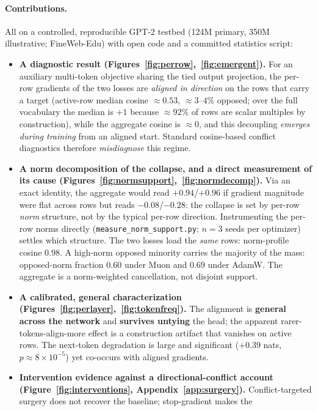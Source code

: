 \paragraph{Contributions.} All on a controlled, reproducible GPT-2 testbed (124M
primary, 350M illustrative; FineWeb-Edu) with open code and a committed statistics
script:
\begin{itemize}
\item \textbf{A diagnostic result (Figures~\ref{fig:perrow},~\ref{fig:emergent}).}
  For an auxiliary multi-token objective sharing the tied output projection, the
  per-row gradients of the two losses are \emph{aligned in direction} on the rows
  that carry a target (active-row median cosine ${\approx}0.53$, ${\approx}3$--$4\%$
  opposed; over the full vocabulary the median is $+1$ because ${\approx}92\%$
  of rows are scalar multiples by construction), while the aggregate cosine is
  $\approx 0$, and this decoupling \emph{emerges during training} from an aligned
  start. Standard cosine-based conflict diagnostics therefore \emph{misdiagnose}
  this regime.
\item \textbf{A norm decomposition of the collapse, and a direct measurement of
  its cause (Figures~\ref{fig:normsupport},~\ref{fig:normdecomp}).} Via an exact
  identity, the aggregate would read $+0.94$/$+0.96$ if gradient magnitude were
  flat across rows but reads $-0.08$/$-0.28$: the collapse is set by per-row
  \emph{norm} structure, not by the typical per-row direction. Instrumenting the per-row norms directly (\texttt{measure\_norm\_support.py}; $n{=}3$ seeds per optimizer) settles which structure. The two losses load the \emph{same} rows: norm-profile cosine $0.98$. A high-norm opposed minority carries the majority of the mass: opposed-norm fraction $0.60$ under Muon and $0.69$ under AdamW. The
  aggregate is a norm-weighted cancellation, not disjoint support.
\item \textbf{A calibrated, general characterization
  (Figures~\ref{fig:perlayer},~\ref{fig:tokenfreq}).} The alignment is
  \textbf{general across the network} and \textbf{survives untying} the head; the
  apparent rarer-tokens-align-more effect is a construction artifact that vanishes
  on active rows. The next-token degradation is large and
  significant ($+0.39$ nats, $p\approx 8\times10^{-5}$) yet co-occurs with aligned
  gradients.
\item \textbf{Intervention evidence against a directional-conflict account
  (Figure~\ref{fig:interventions}, Appendix~\ref{app:surgery}).}
  Conflict-targeted surgery does not recover the baseline; stop-gradient makes the

\end{itemize}
